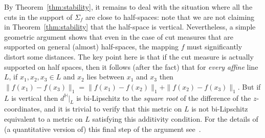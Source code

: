 \documentclass{icm2010}
\theoremstyle{definition}
\newcommand{\1}{\mathbf{1}}
\renewcommand{\H}{\mathbb{H}}
\begin{document}
By Theorem~\ref{thm:stability}, it remains to deal with the
situation where all the cuts in the support of $\Sigma_f$ are close
to half-spaces: note that we are not claiming in
Theorem~\ref{thm:stability} that the half-space is vertical.
Nevertheless, a simple geometric argument shows that even in the
case of cut measures that are supported on general (almost)
half-spaces, the mapping $f$ must significantly distort some
distances. The key point here is that if the cut measure is actually
supported on half spaces, then it follows (after the fact)  that for
{\em every  affine} line $L$, if $x_1,x_2,x_3\in L$ and $x_2$ lies
between $x_1$ and $x_3$ then
$\|f(x_1)-f(x_3)\|_1=\|f(x_1)-f(x_2)\|_1+\|f(x_2)-f(x_3)\|_1$. But
if $L$ is vertical then $d^\H|_L$ is bi-Lipschitz to the {\em square
root} of the difference of the $z$-coordinates, and it is trivial to
verify that this metric on $L$ is not bi-Lipschitz equivalent to a
metric on $L$ satisfying this additivity condition. For the details
of (a quantitative version of) this final step of the argument
see~\cite[Sec.\ 10]{CKN09}.









\end{document}
